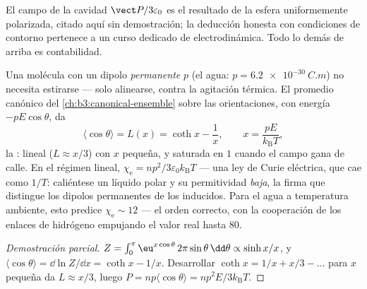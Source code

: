 \begin{remark}
El campo de la cavidad $\vect P/3\varepsilon_0$ es el resultado de la esfera
uniformemente polarizada, citado aquí sin demostración; la deducción honesta
con condiciones de contorno pertenece a un curso dedicado de electrodinámica. Todo
lo demás de arriba es contabilidad.
\end{remark}

\begin{proposition}\label{prop:b3:electromagnetism-in-matter:langevin}
Una molécula con un dipolo \emph{permanente} $p$ (el agua:
$p = \qty{6.2e-30}{C.m}$) no necesita estirarse --- solo alinearse,
contra la agitación térmica. El promedio canónico del
\cref{ch:b3:canonical-ensemble} sobre las orientaciones, con energía
$-pE\cos\theta$, da
\[
\langle\cos\theta\rangle = L(x) = \coth x - \frac1x ,
\qquad x = \frac{pE}{k_{\text{B}}T} ,
\]
la \emph{}: lineal ($L \approx x/3$) con $x$ pequeña, y
saturada en $1$ cuando el campo gana de calle. En el régimen lineal,
$\chi_{\text{e}} = np^2/3\varepsilon_0k_{\text{B}}T$ --- una ley de Curie
eléctrica, que cae como $1/T$: caliéntese un líquido polar y su permitividad
\emph{baja}, la firma que distingue los dipolos permanentes de los
inducidos. Para el agua a temperatura ambiente, esto predice
$\chi_{\text{e}} \sim 12$ --- el orden correcto, con la cooperación de los enlaces
de hidrógeno empujando el valor real hasta $80$.
\end{proposition}

\begin{proof}[Demostración parcial]
$Z = \int_0^\pi \eu^{x\cos\theta}\,2\pi\sin\theta\,\dd\theta \propto
\sinh x/x$, y $\langle\cos\theta\rangle = \dd\ln Z/\dd x = \coth x
- 1/x$. Desarrollar $\coth x = 1/x + x/3 - \dots$ para $x$ pequeña da
$L \approx x/3$, luego $P = np\langle\cos\theta\rangle =
np^2E/3k_{\text{B}}T$.
\end{proof}

